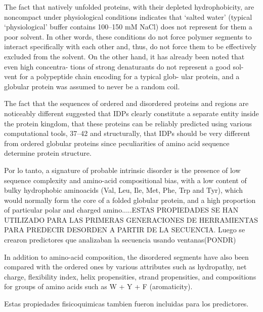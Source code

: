 The fact that natively unfolded proteins, with their depleted hydrophobicity, are noncompact under physiological conditions indicates that ‘salted water’ (typical ‘physiological’ buffer contains 100–150 mM NaCl) does not represent for them a poor solvent.
In other words, these
conditions do not force polymer segments to interact
specifically with each other and, thus, do not force them
to be effectively excluded from the solvent. On the other
hand, it has already been noted that even high concentra-
tions of strong denaturants do not represent a good sol-
vent for a polypeptide chain encoding for a typical glob-
ular protein, and a globular protein was assumed to never
be a random coil.


The fact that the sequences of ordered and disordered proteins and regions are noticeably different suggested that IDPs clearly constitute a separate entity inside the protein kingdom, 
that these proteins can be reliably predicted using various computational tools, 37–42 and structurally, 
that IDPs should be very different from ordered globular proteins since peculiarities of amino acid sequence determine protein structure.

Por lo tanto, a signature of probable intrinsic disorder is the presence of low sequence complexity and amino-acid compositional bias, with a low content of bulky hydrophobic aminoacids (Val, Leu, Ile, Met, Phe, Trp and Tyr), which would
normally form the core of a folded globular protein, and a high proportion of particular polar and charged amino.....ESTAS PROPIEDADES SE HAN UTILIZADO PARA LAS PRIMERAS GENERACIONES DE HERRAMIENTAS PARA PREDECIR DESORDEN A PARTIR DE LA SECUENCIA.
Luego se crearon predictores que analizaban la secuencia usando ventanas(PONDR)

In addition to amino-acid composition, the disordered segments have also been compared with the ordered ones by various attributes such as hydropathy, net charge, flexibility index, helix
propensities, strand propensities, and compositions for groups of amino acids such as W + Y + F (aromaticity).

Estas propiedades fisicoquimicas tambien fueron incluidas para los predictores.




